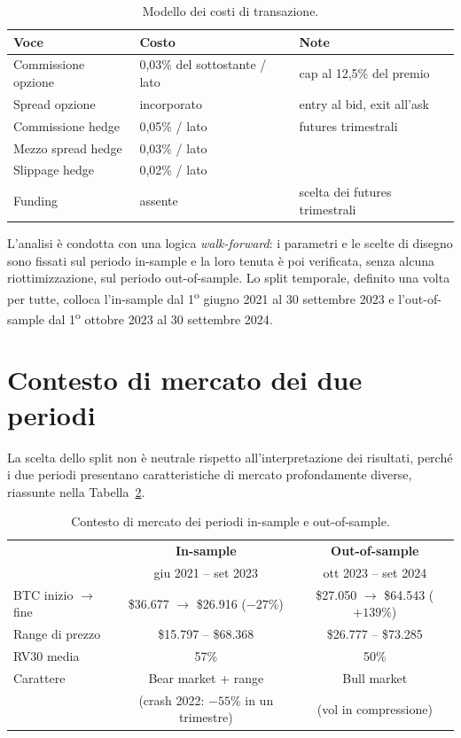 \begin{table}[H]
\centering
\caption{Modello dei costi di transazione.}
\label{tab:costi}
\setlength{\tabcolsep}{4pt}
\begin{tabular}{lll}
\toprule
\textbf{Voce} & \textbf{Costo} & \textbf{Note} \\
\midrule
Commissione opzione & 0,03\% del sottostante / lato & cap al 12,5\% del premio \\
Spread opzione & incorporato & entry al bid, exit all'ask \\
Commissione hedge & 0,05\% / lato & futures trimestrali \\
Mezzo spread hedge & 0,03\% / lato & \\
Slippage hedge & 0,02\% / lato & \\
Funding & assente & scelta dei futures trimestrali \\
\bottomrule
\end{tabular}
\end{table}

L'analisi è condotta con una logica \emph{walk-forward}: i parametri e le
scelte di disegno sono fissati sul periodo in-sample e la loro tenuta è poi
verificata, senza alcuna riottimizzazione, sul periodo out-of-sample. Lo
split temporale, definito una volta per tutte, colloca l'in-sample dal
1\textsuperscript{o} giugno 2021 al 30 settembre 2023 e l'out-of-sample dal
1\textsuperscript{o} ottobre 2023 al 30 settembre 2024.

\section{Contesto di mercato dei due periodi}
\label{sec:dati-contesto}

La scelta dello split non è neutrale rispetto all'interpretazione dei
risultati, perché i due periodi presentano caratteristiche di mercato
profondamente diverse, riassunte nella Tabella~\ref{tab:contesto-mercato}.

\begin{table}[H]
\centering
\caption{Contesto di mercato dei periodi in-sample e out-of-sample.}
\label{tab:contesto-mercato}
\small
\setlength{\tabcolsep}{4pt}
\begin{tabular}{lcc}
\toprule
 & \textbf{In-sample} & \textbf{Out-of-sample} \\
 & giu 2021 -- set 2023 & ott 2023 -- set 2024 \\
\midrule
BTC inizio $\to$ fine & \$36.677 $\to$ \$26.916 ($-27\%$) & \$27.050 $\to$ \$64.543 ($+139\%$) \\
Range di prezzo & \$15.797 -- \$68.368 & \$26.777 -- \$73.285 \\
RV30 media & 57\% & 50\% \\
Carattere & Bear market + range & Bull market \\
 & (crash 2022: $-55\%$ in un trimestre) & (vol in compressione) \\
\bottomrule
\end{tabular}
\end{table}

